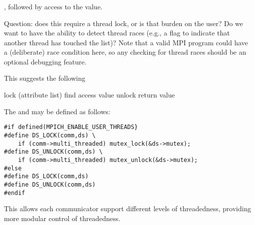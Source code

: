 \documentclass{article}
\begin{document}


\subsubsection{}
\begin{adi3}
, followed by access to the value.

Question: does this require a thread lock, or is that burden on the user?  Do
we want to have the ability to detect thread races (e.g., a flag to indicate
that another thread has touched the list)?  Note that a valid MPI
program could have a (deliberate) race condition here, so any checking
for thread races should be an optional debugging feature.

This suggests the following
\begin{algorithm}
lock (attribute list)
find 
access value
unlock
return value
\end{algorithm}

The  and  may be defined as follows:
\begin{verbatim}
#if defined(MPICH_ENABLE_USER_THREADS}
#define DS_LOCK(comm,ds) \
    if (comm->multi_threaded) mutex_lock(&ds->mutex);
#define DS_UNLOCK(comm,ds) \
    if (comm->multi_threaded) mutex_unlock(&ds->mutex);
#else
#define DS_LOCK(comm,ds)
#define DS_UNLOCK(comm,ds)
#endif
\end{verbatim}
This allows each communicator support different levels of
threadedness, providing more modular control of threadedness.
\end{adi3}
\end{document}
